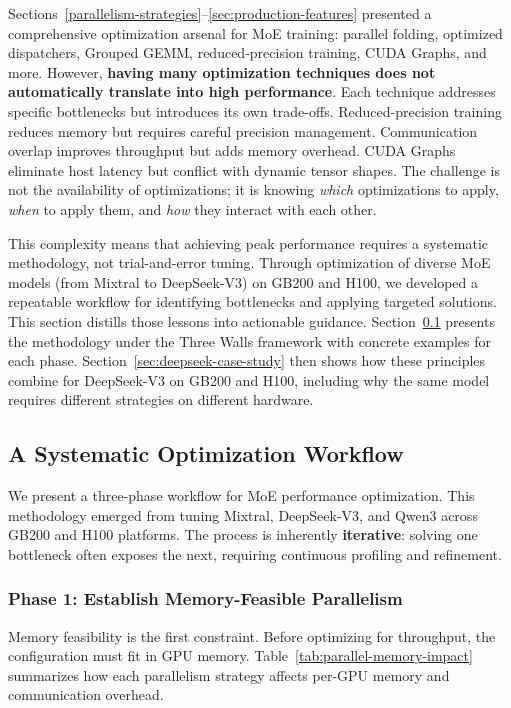 Sections~\ref{parallelism-strategies}--\ref{sec:production-features} presented a comprehensive optimization arsenal for MoE training: parallel folding, optimized dispatchers, Grouped GEMM, reduced-precision training, CUDA Graphs, and more. However, \textbf{having many optimization techniques does not automatically translate into high performance}. Each technique addresses specific bottlenecks but introduces its own trade-offs. Reduced-precision training reduces memory but requires careful precision management. Communication overlap improves throughput but adds memory overhead. CUDA Graphs eliminate host latency but conflict with dynamic tensor shapes. The challenge is not the availability of optimizations; it is knowing \emph{which} optimizations to apply, \emph{when} to apply them, and \emph{how} they interact with each other.

This complexity means that achieving peak performance requires a systematic methodology, not trial-and-error tuning. Through optimization of diverse MoE models (from Mixtral to DeepSeek-V3) on GB200 and H100, we developed a repeatable workflow for identifying bottlenecks and applying targeted solutions. This section distills those lessons into actionable guidance. Section~\ref{sec:best-practices-methodology} presents the methodology under the Three Walls framework with concrete examples for each phase. Section~\ref{sec:deepseek-case-study} then shows how these principles combine for DeepSeek-V3 on GB200 and H100, including why the same model requires different strategies on different hardware.

\subsection{A Systematic Optimization Workflow}\label{sec:best-practices-methodology}

We present a three-phase workflow for MoE performance optimization. This methodology emerged from tuning Mixtral, DeepSeek-V3, and Qwen3 across GB200 and H100 platforms. The process is inherently \textbf{iterative}: solving one bottleneck often exposes the next, requiring continuous profiling and refinement.

\subsubsection{Phase 1: Establish Memory-Feasible Parallelism}

Memory feasibility is the first constraint. Before optimizing for throughput, the configuration must fit in GPU memory. Table~\ref{tab:parallel-memory-impact} summarizes how each parallelism strategy affects per-GPU memory and communication overhead.

